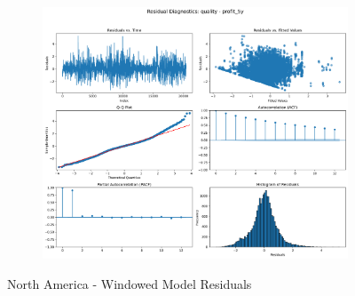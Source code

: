 \documentclass[11pt,english,a4paper,hidelinks]{book}
\begin{document}
\begin{figure}[H]
\begin{subfigure}[b]{0.32\textwidth}
    \end{subfigure}
    \hfill
    \begin{subfigure}[b]{0.32\textwidth}
        \centering
        \includegraphics[width=\textwidth]{images/code/models/linear_regression/third_model/USA/quality_profit_5y_residuals.png}
    \end{subfigure}
    \caption{North America - Windowed Model Residuals}
    \label{fig:linear_regression_USA_residues_windowed}
\end{figure}
\end{document}
